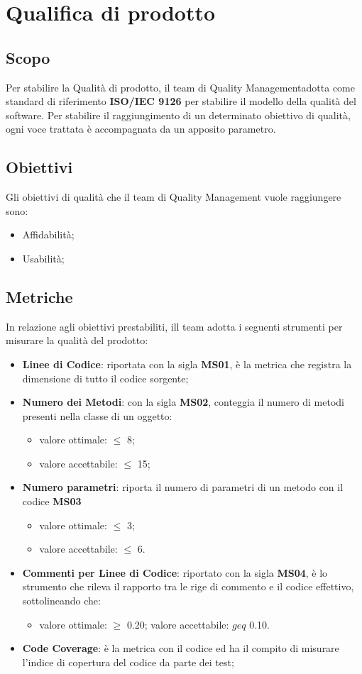 \section{Qualifica di prodotto}
\subsection{Scopo}
Per stabilire la Qualità di prodotto, il team di Quality Management\glo adotta come standard di riferimento \textbf{ISO/IEC 9126} per stabilire il modello della qualità del software. Per stabilire il raggiungimento di un determinato obiettivo di qualità, ogni voce trattata è accompagnata da un apposito parametro.
\subsection{Obiettivi}
Gli obiettivi di qualità che il team di Quality Management vuole raggiungere sono:
\begin{itemize}
\item Affidabilità;
\item Usabilità;
\end{itemize}
\subsection{Metriche}
In relazione agli obiettivi prestabiliti, ill team adotta i seguenti strumenti per misurare la qualità del prodotto: 
\begin{itemize}
\item \textbf{Linee di Codice}: riportata con la sigla \textbf{MS01}, è la metrica che registra la dimensione di tutto il codice sorgente;
\item \textbf{Numero dei Metodi}: con la sigla \textbf{MS02}, conteggia il numero di metodi presenti nella classe di un oggetto:
	\begin{itemize}
	\item valore ottimale: $\leq$ 8;
	\item valore accettabile: $\leq$ 15;
	\end{itemize}
\item \textbf{Numero parametri}: riporta il numero di parametri di un metodo con il codice \textbf{MS03}
	\begin{itemize}
	\item valore ottimale: $\leq$ 3;
	\item valore accettabile: $\leq$ 6.
	\end{itemize}
\item \textbf{Commenti per Linee di Codice}: riportato con la sigla \textbf{MS04}, è lo strumento che rileva il rapporto tra le rige di commento e il codice effettivo, sottolineando che:
	\begin{itemize}
		\item valore ottimale: $\geq$ 0.20;
		\tem valore accettabile: $geq$ 0.10.
	\end{itemize}
\item \textbf{Code Coverage}: è la metrica con il codice  ed ha il compito di misurare l'indice di copertura del codice da parte dei test;

\end{itemize}




